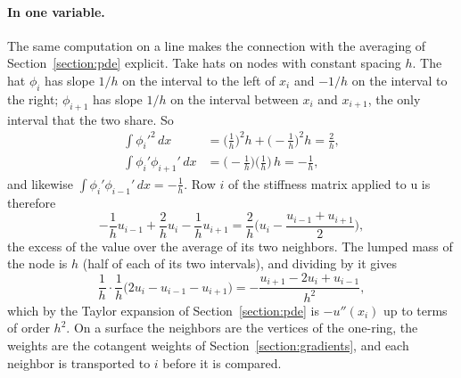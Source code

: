 \paragraph{In one variable.} The same computation on a line makes the connection with the averaging of Section~\ref{section:pde} explicit. Take hats on nodes with constant spacing $h$. The hat $\phi_i$ has slope $1/h$ on the interval to the left of $x_i$ and $-1/h$ on the interval to the right; $\phi_{i+1}$ has slope $1/h$ on the interval between $x_i$ and $x_{i+1}$, the only interval that the two share. So
\begin{align*}
\int \phi_i'^2\, dx &= \Big(\frac1h\Big)^2 h + \Big(-\frac1h\Big)^2 h = \frac2h , \\
\int\phi_i'\phi_{i+1}'\, dx &= \Big(-\frac1h\Big)\Big(\frac1h\Big)\, h = -\frac1h ,
\end{align*}
and likewise $\int\phi_i'\phi_{i-1}'\, dx = -\frac1h$. Row $i$ of the stiffness matrix applied to $\mathrm u$ is therefore
\begin{equation*}
-\frac1h u_{i-1} + \frac2h u_i - \frac1h u_{i+1} = \frac2h\Big(u_i - \frac{u_{i-1} + u_{i+1}}{2}\Big) ,
\end{equation*}
the excess of the value over the average of its two neighbors. The lumped mass of the node is $h$ (half of each of its two intervals), and dividing by it gives
\begin{equation*}
\frac1h\cdot\frac1h\big(2u_i - u_{i-1} - u_{i+1}\big) = -\frac{u_{i+1} - 2u_i + u_{i-1}}{h^2} ,
\end{equation*}
which by the Taylor expansion of Section~\ref{section:pde} is $-u''(x_i)$ up to terms of order $h^2$. On a surface the neighbors are the vertices of the one-ring, the weights are the cotangent weights of Section~\ref{section:gradients}, and each neighbor is transported to $i$ before it is compared.

